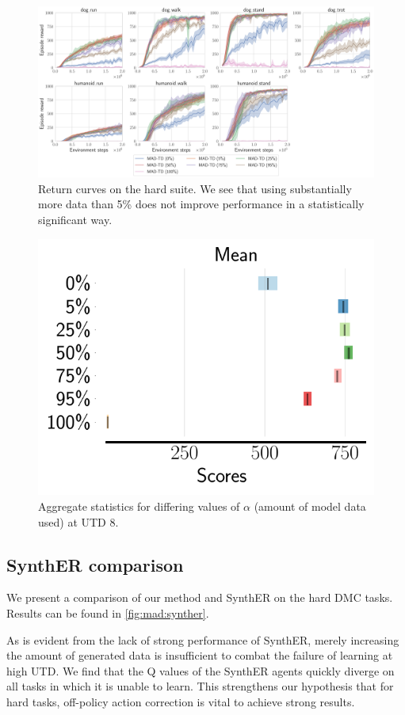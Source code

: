 \begin{figure}[H]
    \centering
    \includegraphics[width=\linewidth]{figures/mad-td/higher_data.pdf}
    \caption{Return curves on the hard suite. We see that using substantially more data than 5\% does not improve performance in a statistically significant way.}
    \label{fig:mad:higher_data}
\end{figure}

\begin{figure}[H]
    \centering
    \includegraphics[width=0.4\linewidth]{figures/mad-td/higher_data_aggregate.pdf}
    \caption{Aggregate statistics for differing values of $\alpha$ (amount of model data used) at UTD 8.}
    \label{fig:mad:higher_data_aggregate}
\end{figure}


\subsection{SynthER comparison}
\label{app:synther}

We present a comparison of our method and SynthER on the hard DMC tasks.
Results can be found in \autoref{fig:mad:synther}.

As is evident from the lack of strong performance of SynthER, merely increasing the amount of generated data is insufficient to combat the failure of learning at high UTD.
We find that the Q values of the SynthER agents quickly diverge on all tasks in which it is unable to learn.
This strengthens our hypothesis that for hard tasks, off-policy action correction is vital to achieve strong results.

